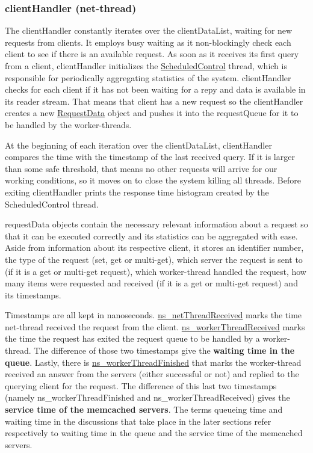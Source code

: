 \documentclass[11pt,a4paper]{article}
\begin{document}
\subsubsection{clientHandler (net-thread)} \label{sec:ov-netthread}
The clientHandler constantly iterates over the clientDataList, waiting for new requests from clients. It employs busy waiting as it non-blockingly check each client to see if there is an available request. As soon as it receives its first query from a client, clientHandler initializes the \underline{ScheduledControl} thread, which is responsible for periodically aggregating statistics of the system. clientHandler checks for each client if it has not been waiting for a repy and data is available in its reader stream. That means that client has a new request so the clientHandler creates a new \underline{RequestData} object and pushes it into the requestQueue for it to be handled by the worker-threads.
\par
At the beginning of each iteration over the clientDataList, clientHandler compares the time with the timestamp of the last received query. If it is larger than some safe threshold, that means no other requests will arrive for our working conditions, so it moves on to close the system killing all threads. Before exiting clientHandler prints the response time histogram created by the ScheduledControl thread.
\par
requestData objects contain the necessary relevant information about a request so that it can be executed correctly and its statistics can be aggregated with ease. Aside from information about its respective client, it stores an identifier number, the type of the request (set, get or multi-get), which server the request is sent to (if it is a get or multi-get request), which worker-thread handled the request, how many items were requested and received (if it is a get or multi-get request) and its timestamps.
\par
Timestamps are all kept in nanoseconds. \underline{ns\_netThreadReceived} marks the time net-thread received the request from the client. \underline{ns\_workerThreadReceived} marks the time the request has exited the request queue to be handled by a worker-thread. The difference of those two timestamps give the \textbf{waiting time in the queue}. Lastly, there is \underline{ns\_workerThreadFinished} that marks the worker-thread received an answer from the servers (either successful or not) and replied to the querying client for the request. The difference of this last two timestamps (namely ns\_workerThreadFinished and ns\_workerThreadReceived) gives the \textbf{service time of the memcached servers}. The terms queueing time and waiting time in the discussions that take place in the later sections refer respectively to waiting time in the queue and the service time of the memcached servers.
\end{document}
